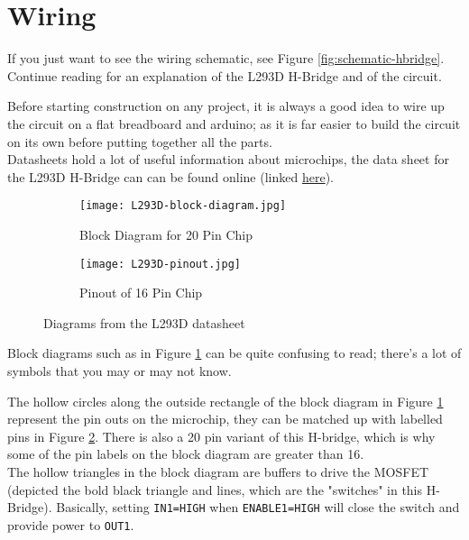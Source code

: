 \documentclass[../TinyBot.tex]{subfiles}
\begin{document}
\section{Wiring} \label{wiring}
If you just want to see the wiring schematic, see Figure \ref{fig:schematic-hbridge}. Continue reading for an explanation of the L293D H-Bridge and of the circuit. 

\bigskip

Before starting construction on any project, it is always a good idea to wire up the circuit on a flat breadboard and arduino; as it is far easier to build the circuit on its own before putting together all the parts. \\

Datasheets hold a lot of useful information about microchips, the data sheet for the L293D H-Bridge can can be found online (linked \href{https://www.altronics.com.au/p/z2900-l293d-motor-drive-ic/}{here}).

\begin{figure}[h]
    \centering
     \begin{subfigure}[b]{0.5\textwidth}
         \centering
         \texttt{[image: L293D-block-diagram.jpg]}
         \caption{Block Diagram for 20 Pin Chip}
         \label{fig:l293d-block-diagram}
     \end{subfigure}
     \hfill
     \begin{subfigure}[b]{0.3\textwidth}
         \centering
         \texttt{[image: L293D-pinout.jpg]}
         \caption{Pinout of 16 Pin Chip}
         \label{fig:l293d-pinout}
     \end{subfigure}
     \hfill
        \caption{Diagrams from the L293D datasheet}
        \label{fig:l293d}
\end{figure}

Block diagrams such as in Figure \ref{fig:l293d-block-diagram} can be quite confusing to read; there's a lot of symbols that you may or may not know. 

The hollow circles along the outside rectangle of the block diagram in Figure \ref{fig:l293d-block-diagram} represent the pin outs on the microchip, they can be matched up with labelled pins in Figure \ref{fig:l293d-pinout}. There is also a 20 pin variant of this H-bridge, which is why some of the pin labels on the block diagram are greater than 16.\\

The hollow triangles in the block diagram are buffers to drive the MOSFET (depicted the bold black triangle and lines, which are the "switches" in this H-Bridge). Basically, setting \lstinline[]!IN1=HIGH! when \lstinline[]!ENABLE1=HIGH! will close the switch and provide power to \lstinline[]!OUT1!. 
\end{document}
